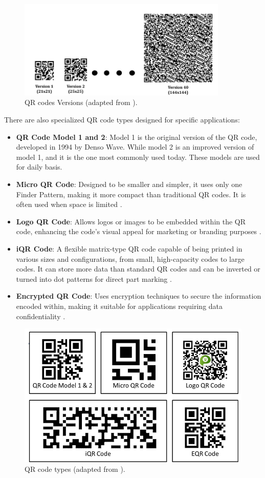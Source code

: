 \begin{figure}[h]
	\centering
	\includegraphics[width=10cm]{assets/ch2/qr_versions}
	\caption{QR codes Versions (adapted from \cite{Tiwari2016}).}
	\label{QR_versions}
\end{figure}


There are also specialized QR code types designed for specific applications:

\begin{itemize}
	\item \textbf{QR Code Model 1 and 2}:
	Model 1 is the original version of the QR code, developed in 1994 by Denso Wave. While model 2 is an improved version of model 1, and it is the one most commonly used today. These models are used for daily basis.
	\item \textbf{Micro QR Code}: Designed to be smaller and simpler, it uses only one Finder Pattern, making it more compact than traditional QR codes. It is often used when space is limited \cite{Tiwari2016}.
	\item \textbf{Logo QR Code}: Allows logos or images to be embedded within the QR code, enhancing the code's visual appeal for marketing or branding purposes \cite{Tiwari2016}.
	\item \textbf{iQR Code}: A flexible matrix-type QR code capable of being printed in various sizes and configurations, from small, high-capacity codes to large codes. It can store more data than standard QR codes and can be inverted or turned into dot patterns for direct part marking \cite{Tiwari2016}.
	\item \textbf{Encrypted QR Code}: Uses encryption techniques to secure the information encoded within, making it suitable for applications requiring data confidentiality \cite{Tiwari2016}.
\end{itemize}

\begin{figure}
	\centering
	\includegraphics[width=0.7\linewidth]{assets/ch2/qr_codes_type}
	\caption{QR code types (adapted from \cite{Tiwari2016}).}
	\label{qr_code_type}
\end{figure}

